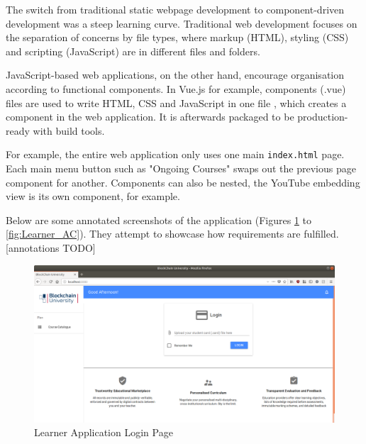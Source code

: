 The switch from traditional static webpage development to component-driven development was a steep learning curve.
Traditional web development focuses on the separation of concerns by file types, where markup (HTML), 
styling (CSS) and scripting (JavaScript) are in different files and folders.

JavaScript-based web applications, on the other hand, encourage organisation according to functional components. 
In Vue.js for example, components (.vue) files are used to write HTML, CSS and JavaScript in one file \citep{vue2017components}, 
which creates a component in the web application. It is afterwards packaged to be production-ready with build tools.

For example, the entire web application only uses one main \texttt{index.html} page. Each main menu button 
such as "Ongoing Courses" swaps out the previous page component for another. Components can also be nested, 
the YouTube embedding view is its own component, for example.

Below are some annotated screenshots of the application (Figures \ref{fig:Learner_login} to 
\ref{fig:Learner_AC}). They attempt to showcase how requirements are fulfilled. [annotations TODO]

\begin{figure}[!ht]
	\centering
	\includegraphics[width=1.0\textwidth]{Learner_login}
	\caption[Learner Application Login Page]
	{Learner Application Login Page}
	\label{fig:Learner_login}
\end{figure}

